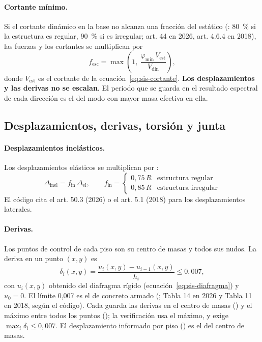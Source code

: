 \paragraph{Cortante mínimo.} Si el cortante dinámico en la base no alcanza una fracción del estático
(: 80~\% si la estructura es regular, 90~\% si es irregular; art. 44 en 2026, art. 4.6.4 en
2018), las fuerzas y los cortantes se multiplican por
\begin{equation}
	f_{\text{esc}} = \max\!\left(1,\ \frac{\varphi_{\min}\,V_{\text{est}}}{V_{\text{din}}}\right),
	\label{eq:sis-escala}
\end{equation}
donde $V_{\text{est}}$ es el cortante de la ecuación~\eqref{eq:sis-cortante}. \textbf{Los desplazamientos y las derivas
no se escalan}. El periodo que se guarda en el resultado espectral de cada dirección es el del modo con mayor masa
efectiva en ella.

\subsection{Desplazamientos, derivas, torsión y junta}
\label{sec:sis-derivas}

\paragraph{Desplazamientos inelásticos.} Los desplazamientos elásticos se multiplican por
:
\begin{equation}
	\Delta_{\text{inel}} = f_{\text{in}}\,\Delta_{\text{el}}, \qquad
	f_{\text{in}} = \begin{cases} 0{,}75\,R & \text{estructura regular} \\ 0{,}85\,R & \text{estructura irregular} \end{cases}
	\label{eq:sis-inelastico}
\end{equation}
El código cita el art. 50.3 (2026) o el art. 5.1 (2018) para los desplazamientos laterales.

\paragraph{Derivas.} Los puntos de control de cada piso son su centro de masas y todos sus nudos. La deriva en un punto
$(x, y)$ es
\begin{equation}
	\delta_i(x, y) = \frac{u_i(x, y) - u_{i-1}(x, y)}{h_i} \le 0{,}007,
	\label{eq:sis-deriva}
\end{equation}
con $u_i(x, y)$ obtenido del diafragma rígido (ecuación~\ref{eq:sis-diafragma}) y $u_0 = 0$. El límite 0,007 es el de
concreto armado (; Tabla 14 en 2026 y Tabla 11 en 2018, según el
código). Cada  guarda las derivas en el centro de masas () y el máximo entre todos los
puntos (); la verificación usa el máximo, y  exige
$\max_i \delta_i \le 0{,}007$. El desplazamiento informado por piso () es el del centro de masas.


